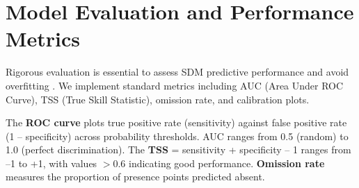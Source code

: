 \documentclass[11pt,a4paper]{article}
\begin{document}
\section{Model Evaluation and Performance Metrics}

Rigorous evaluation is essential to assess SDM predictive performance and avoid overfitting \cite{fielding1997review}. We implement standard metrics including AUC (Area Under ROC Curve), TSS (True Skill Statistic), omission rate, and calibration plots.

The \textbf{ROC curve} plots true positive rate (sensitivity) against false positive rate (1 -- specificity) across probability thresholds. AUC ranges from 0.5 (random) to 1.0 (perfect discrimination). The \textbf{TSS} = sensitivity + specificity -- 1 ranges from --1 to +1, with values $>0.6$ indicating good performance. \textbf{Omission rate} measures the proportion of presence points predicted absent.
\end{document}
